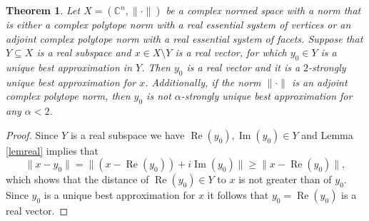 \documentclass[12pt, reqno]{amsart}
\newtheorem{twr}{Theorem}[section]
\theoremstyle{definition}
\theoremstyle{remark}
\numberwithin{equation}{section}
\DeclareMathOperator{\re}{Re}
\DeclareMathOperator{\im}{Im}
\begin{document}
\begin{twr}
\label{twrpolytope}
Let $X=(\mathbb{C}^n, \| \cdot \|)$ be a complex normed space with a norm that is either a complex polytope norm with a real essential system of vertices or an adjoint complex polytope norm with a real essential system of facets. Suppose that $Y \subseteq X$ is a real subspace and $x \in X \setminus Y$ is a real vector, for which $y_0 \in Y$ is a unique best approximation in $Y$. Then $y_0$ is a real vector and it is a $2$-strongly unique best approximation for $x$. Additionally, if the norm $\| \cdot \|$ is an adjoint complex polytope norm, then $y_0$ is not $\alpha$-strongly unique best approximation for any $\alpha<2$.
\end{twr}
\begin{proof}
Since $Y$ is a real subspace we have $\re(y_0), \im(y_0) \in Y$ and Lemma \ref{lemreal} implies that
$$\|x-y_0\|=\|(x-\re(y_0)) + i\im(y_0)\| \geq \|x-\re(y_0)\|,$$
which shows that the distance of $\re(y_0) \in Y$ to $x$ is not greater than of $y_0$. Since $y_0$ is a unique best approximation for $x$ it follows that $y_0=\re(y_0)$ is a real vector.


\end{proof}
\end{document}
